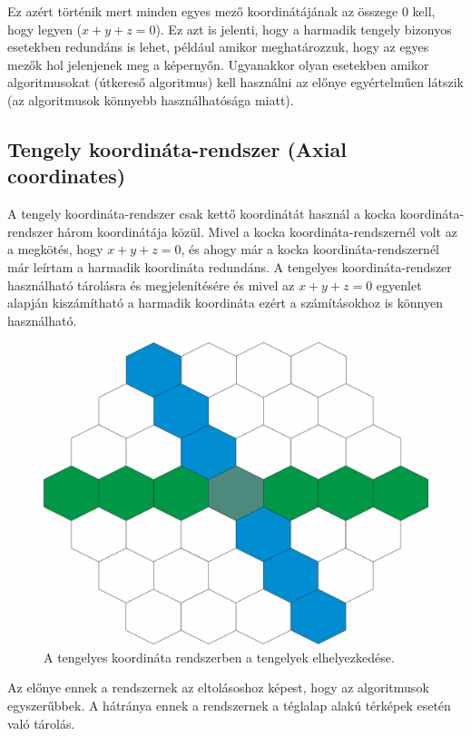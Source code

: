 \noindent Ez azért történik mert minden egyes mező koordinátájának az összege $0$ kell, hogy legyen ($x + y + z = 0$). Ez azt is jelenti, hogy a harmadik tengely bizonyos esetekben redundáns is lehet, például amikor meghatározzuk, hogy az egyes mezők hol jelenjenek meg a képernyőn. Ugyanakkor olyan esetekben amikor algoritmusokat (útkereső algoritmus) kell használni az előnye egyértelműen látszik (az algoritmusok könnyebb használhatósága miatt). 

\subsection{Tengely koordináta-rendszer (Axial coordinates)}

A tengely koordináta-rendszer csak kettő koordinátát használ a kocka koordináta-rendszer három koordinátája közül. Mivel a kocka koordináta-rendszernél volt az a megkötés, hogy $x + y + z = 0$, és ahogy már a kocka koordináta-rendszernél már leírtam a harmadik koordináta redundáns.  A tengelyes koordináta-rendszer használható tárolásra és megjelenítésére és mivel az $x + y + z = 0$ egyenlet alapján kiszámítható a harmadik koordináta ezért a számításokhoz is könnyen használható.

\begin{figure}[h!]
\centering
\includegraphics[scale=0.2]{kepek/AxialCoord.jpg}
\caption{A tengelyes koordináta rendszerben a tengelyek elhelyezkedése.}
\label{fig:AxialCoord}
\end{figure}

\noindent Az előnye ennek a rendszernek az eltolásoshoz képest, hogy az algoritmusok egyszerűbbek. A hátránya ennek a rendszernek a téglalap alakú térképek esetén való tárolás. 

